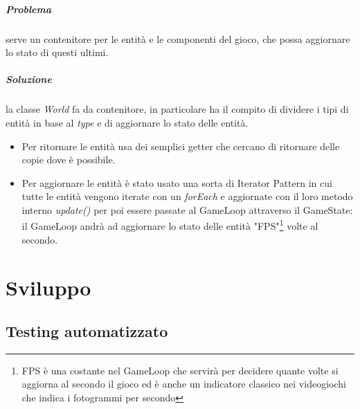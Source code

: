 \documentclass[a4paper,12pt]{report}
\begin{document}
 \paragraph*{Problema} serve un contenitore per le entità e le componenti del gioco, che possa aggiornare lo stato di questi ultimi.
 \paragraph*{Soluzione} la classe \emph{World} fa da contenitore, in particolare ha il compito di dividere i tipi di entità in base al \emph{type} e di aggiornare lo stato delle entità.
 \begin{itemize}
    \item Per ritornare le entità usa dei semplici getter che cercano di ritornare delle copie dove è possibile.
    \item Per aggiornare le entità è stato usato una sorta di Iterator Pattern in cui tutte le entità vengono iterate con un \emph{forEach} e aggiornate con il loro metodo interno \emph{update()} per poi essere passate al GameLoop attraverso il GameState: il GameLoop andrà ad aggiornare lo stato delle entità "FPS"\footnote[2]{FPS è una costante nel GameLoop che servirà per decidere quante volte si aggiorna al secondo il gioco ed è anche un indicatore classico nei videogiochi che indica i fotogrammi per secondo} volte al secondo.
 \end{itemize}

\chapter{Sviluppo}

\section{Testing automatizzato}
\end{document}
